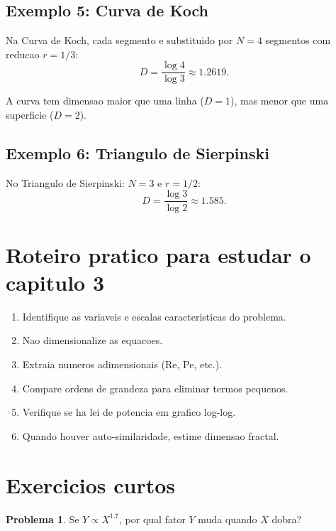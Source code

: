 \documentclass[12pt,a4paper,oneside]{book}
\theoremstyle{definition}
\newtheorem{problem}{Problema}
\begin{document}
\subsection{Exemplo 5: Curva de Koch}

Na Curva de Koch, cada segmento e substituido por $N=4$ segmentos com reducao $r=1/3$:
\begin{equation}
D = \frac{\log 4}{\log 3} \approx 1.2619.
\end{equation}

A curva tem dimensao maior que uma linha ($D=1$), mas menor que uma superficie ($D=2$).

\subsection{Exemplo 6: Triangulo de Sierpinski}

No Triangulo de Sierpinski: $N=3$ e $r=1/2$:
\begin{equation}
D = \frac{\log 3}{\log 2} \approx 1.585.
\end{equation}

\section{Roteiro pratico para estudar o capitulo 3}

\begin{enumerate}
    \item Identifique as variaveis e escalas caracteristicas do problema.
    \item Nao dimensionalize as equacoes.
    \item Extraia numeros adimensionais (Re, Pe, etc.).
    \item Compare ordens de grandeza para eliminar termos pequenos.
    \item Verifique se ha lei de potencia em grafico log-log.
    \item Quando houver auto-similaridade, estime dimensao fractal.
\end{enumerate}

\section{Exercicios curtos}

\begin{problem}
Se $Y \propto X^{1.7}$, por qual fator $Y$ muda quando $X$ dobra?
\end{problem}
\end{document}
